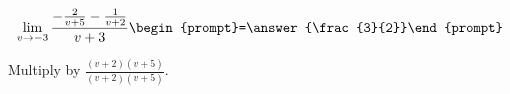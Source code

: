 \documentclass{ximera}
\author{Bart Snapp}
\begin{document}
\begin{exercise}

\[
\lim_{v\to -3 } \frac{-\frac{2}{v+5}-\frac{1}{v+2}}{v+3}  \begin{prompt}=\answer{\frac{3}{2}}\end{prompt}
\]
\begin{hint}
Multiply by $\frac{(v+2) (v+5)}{(v+2) (v+5)}$.
\end{hint}
\end{exercise}
\end{document}
